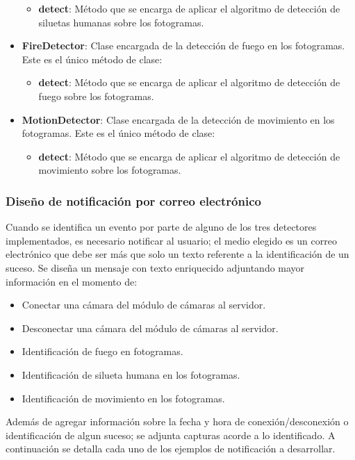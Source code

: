 \begin{itemize}
        \begin{itemize}
            \item \textbf{detect}: Método que se encarga de aplicar el algoritmo de detección de siluetas humanas sobre los fotogramas.
        \end{itemize}
    \item \textbf{FireDetector}: Clase encargada de la detección de fuego en los fotogramas. Este es el único método de clase:
        \begin{itemize}
            \item \textbf{detect}: Método que se encarga de aplicar el algoritmo de detección de fuego sobre los fotogramas.
        \end{itemize}
    \item \textbf{MotionDetector}: Clase encargada de la detección de movimiento en los fotogramas. Este es el único método de clase:
        \begin{itemize}
            \item \textbf{detect}: Método que se encarga de aplicar el algoritmo de detección de movimiento sobre los fotogramas.
        \end{itemize}
\end{itemize}

\subsubsection{Diseño de notificación por correo electrónico}
Cuando se identifica un evento por parte de alguno de los tres detectores implementados, es necesario notificar al usuario; el medio elegido es un correo electrónico que debe ser más que solo un texto referente a la identificación de un suceso. Se diseña un mensaje con texto enriquecido adjuntando mayor información en el momento de:
\begin{itemize}
    \item Conectar una cámara del módulo de cámaras al servidor.
    \item Desconectar una cámara del módulo de cámaras al servidor.
    \item Identificación de fuego en fotogramas.
    \item Identificación de silueta humana en los fotogramas.
    \item Identificación de movimiento en los fotogramas.
\end{itemize}
Además de agregar información sobre la fecha y hora de conexión/desconexión o identificación de algun suceso; se adjunta capturas acorde a lo identificado. A continuación se detalla cada uno de los ejemplos de notificación a desarrollar.

